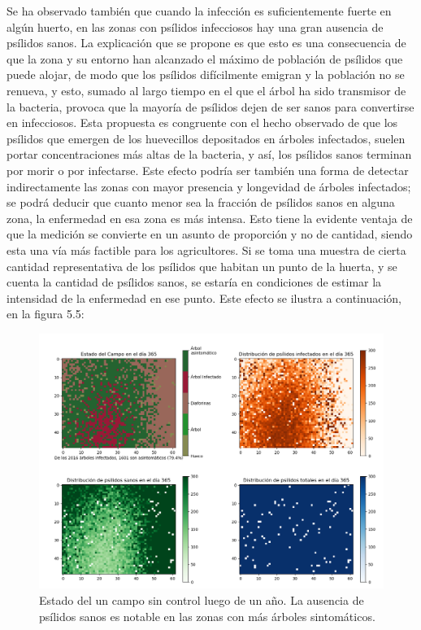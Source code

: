 Se ha observado también que cuando la infección es suficientemente fuerte en algún huerto, en las zonas con psílidos infecciosos hay una gran ausencia de psílidos sanos. La explicación que se propone es que esto es una consecuencia de que la zona y su entorno han alcanzado el máximo de población de psílidos que puede alojar, de modo que los psílidos difícilmente emigran y la población no se renueva, y esto, sumado al largo tiempo en el que el árbol ha sido transmisor de la bacteria, provoca que la mayoría de psílidos dejen de ser sanos para convertirse en infecciosos. Esta propuesta es congruente con el hecho observado de que los psílidos que emergen de los huevecillos depositados en árboles infectados, suelen portar concentraciones más altas de la bacteria, y así, los psílidos sanos terminan por morir o por infectarse.
Este efecto podría ser también una forma de detectar indirectamente las zonas con mayor presencia y longevidad de árboles infectados; se podrá deducir que cuanto menor sea la fracción de psílidos sanos en alguna zona, la enfermedad en esa zona es más intensa. Esto tiene la evidente ventaja de que la medición se convierte en un asunto de proporción y no de cantidad, siendo esta una vía más factible para los agricultores. Si se toma una muestra de cierta cantidad representativa de los psílidos que habitan un punto de la huerta, y se cuenta la cantidad de psílidos sanos, se estaría en condiciones de estimar la intensidad de la enfermedad en ese punto. Este efecto se ilustra a continuación, en la figura 5.5:
\begin{figure}[H]
\centering
\includegraphics[width=1.\textwidth,keepaspectratio=true]{images/Imágenes C6/C6-4.png}
\caption{Estado del un campo sin control luego de un año. La ausencia de psílidos sanos es notable en las zonas con más árboles sintomáticos.}
\end{figure}

